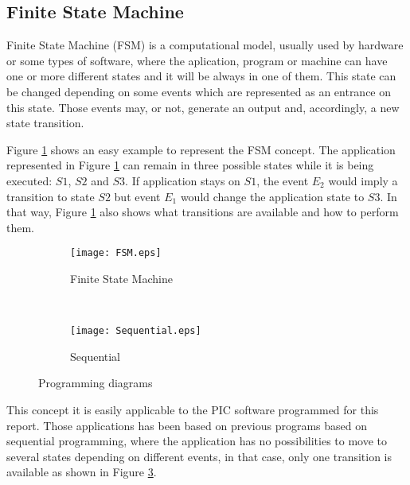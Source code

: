 \subsection{Finite State Machine}\label{S:Res:Code:FSM}
Finite State Machine (FSM) is a computational model, usually used by hardware or some types of software, where the aplication, program or machine can have one or more different states and it will be always in one of them. This state can be changed depending on some events which are represented as an entrance on this state. Those events may, or not, generate an output and, accordingly, a new state transition.
\medskip

Figure \ref{fig:FSM} shows an easy example to represent the FSM concept. The application represented in Figure \ref{fig:FSM} can remain in three possible states while it is being executed: $S1$, $S2$ and $S3$. If application stays on $S1$, the event $E_{2}$ would imply a transition to state $S2$ but event $E_{1}$ would change the application state to $S3$. In that way, Figure \ref{fig:FSM} also shows what transitions are available and how to perform them.

\begin{figure}[h]
\centering
	\begin{subfigure}[b]{0.45\textwidth}
	\texttt{[image: FSM.eps]}
	\caption{Finite State Machine}
	\label{fig:FSM}
	\end{subfigure}
	~
	\begin{subfigure}[b]{0.25\textwidth}
	\texttt{[image: Sequential.eps]}
	\caption{Sequential}
	\label{fig:Sequential}
	\end{subfigure}
\caption{Programming diagrams}
\end{figure}

This concept it is easily applicable to the PIC software programmed for this report. Those applications has been based on previous programs based on sequential programming, where the application has no possibilities to move to several states depending on different events, in that case, only one transition is available as shown in Figure \ref{fig:Sequential}.